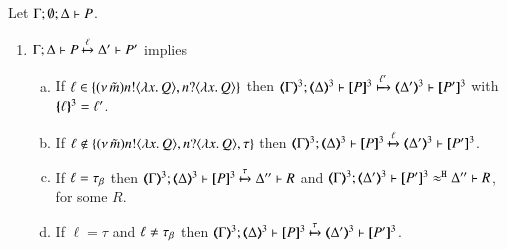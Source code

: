 \begin{proposition}\myrm
	\label{app:prop:op_corr_HOpp_to_HOp}
	Let $\Gamma; \emptyset; \Delta \vdash P$.
	
	\begin{enumerate}
		\item	
			$\Gamma; \Delta \vdash P \xmapsto{\ell} \Delta' \vdash P'$ implies
%
			\begin{enumerate}[a)]
				\item	If $\ell \in \{(\nu\, \tilde{m}) n ! \langle \lambda x.\,Q \rangle, n ? \langle \lambda x.\,Q \rangle\}$ then
					$\horel{\tmap{\Gamma}{3}}{\tmap{\Delta}{3}}{\pmap{P}{3}}{\hby{\ell'}}
					{\tmap{\Delta'}{3}}{\pmap{P'}{3}}$ with $\{\!\!\{\ell\}\!\!\}^{3} = \ell'$.

%
%

				\item	If $\ell \notin \{(\nu\, \tilde{m}) n ! \langle \lambda x.\,Q \rangle, n ? \langle \lambda x.\,Q \rangle, \tau\}$ then
					$\horel{\tmap{\Gamma}{3}}{\tmap{\Delta}{3}}{\pmap{P}{3}}{\hby{\ell}}
					{\tmap{\Delta'}{3}}{\pmap{P'}{3}}$.

				\item	If $\ell = \tau_{\beta}$ then
					$\horel{\tmap{\Gamma}{3}}{\tmap{\Delta}{3}}{\pmap{P}{3}}{\hby{\tau}}
					{\Delta''}{R}$ and
					$\horel{\tmap{\Gamma}{3}}{\tmap{\Delta'}{3}}{\pmap{P'}{3}}{\hwb}{\Delta''}{R}$, for some $R$.

				\item	If $\ell = \tau$ and $\ell \not= \tau_{\beta}$ then %
					$\horel{\tmap{\Gamma}{3}}{\tmap{\Delta}{3}}{\pmap{P}{3}}{\hby{\tau}}
					{\tmap{\Delta'}{3}}{\pmap{P'}{3}}$.
			\end{enumerate}


\end{enumerate}
\end{proposition}
